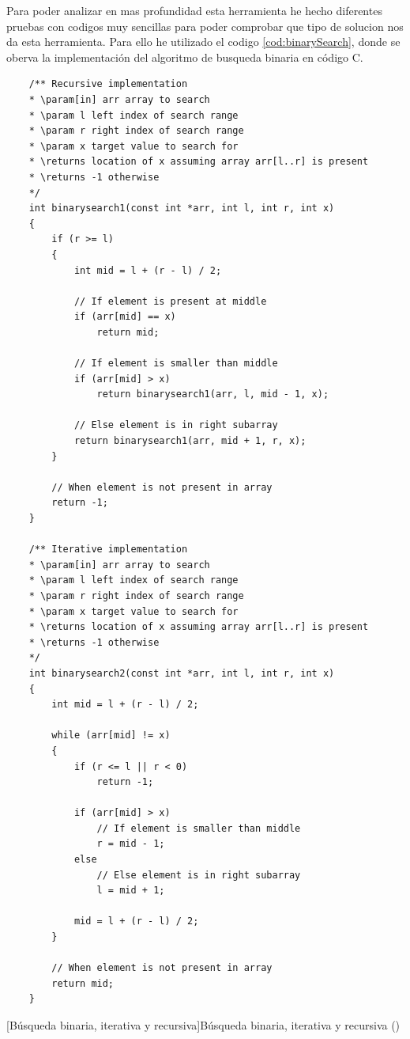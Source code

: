 Para poder analizar en mas profundidad esta herramienta he hecho diferentes pruebas con codigos muy sencillas para poder comprobar que tipo de solucion nos da esta herramienta. Para ello
he utilizado el codigo \ref{cod:binarySearch}, donde se oberva la implementación del algoritmo de busqueda binaria en código C.

\begin{code}
    \begin{verbatim}
    /** Recursive implementation
    * \param[in] arr array to search
    * \param l left index of search range
    * \param r right index of search range
    * \param x target value to search for
    * \returns location of x assuming array arr[l..r] is present
    * \returns -1 otherwise
    */
    int binarysearch1(const int *arr, int l, int r, int x)
    {
        if (r >= l)
        {
            int mid = l + (r - l) / 2;

            // If element is present at middle
            if (arr[mid] == x)
                return mid;

            // If element is smaller than middle
            if (arr[mid] > x)
                return binarysearch1(arr, l, mid - 1, x);

            // Else element is in right subarray
            return binarysearch1(arr, mid + 1, r, x);
        }

        // When element is not present in array
        return -1;
    }

    /** Iterative implementation
    * \param[in] arr array to search
    * \param l left index of search range
    * \param r right index of search range
    * \param x target value to search for
    * \returns location of x assuming array arr[l..r] is present
    * \returns -1 otherwise
    */
    int binarysearch2(const int *arr, int l, int r, int x)
    {
        int mid = l + (r - l) / 2;

        while (arr[mid] != x)
        {
            if (r <= l || r < 0)
                return -1;

            if (arr[mid] > x)
                // If element is smaller than middle
                r = mid - 1;
            else
                // Else element is in right subarray
                l = mid + 1;

            mid = l + (r - l) / 2;
        }

        // When element is not present in array
        return mid;
    }
    \end{verbatim}
    [Búsqueda binaria, iterativa y recursiva]{Búsqueda binaria, iterativa y recursiva (\cite{BinarySearchGitHub})}
    \label{cod:binarySearch}
\end{code}

